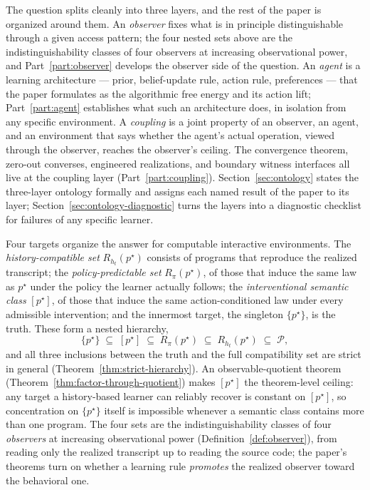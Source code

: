 \documentclass[11pt]{article}
\theoremstyle{definition}
\theoremstyle{remark}
\theoremstyle{plain}
\theoremstyle{definition}
\newcommand{\Pcal}{\mathcal{P}}
\begin{document}
The question splits cleanly into three layers, and the rest of the paper is organized around them. An \emph{observer} fixes what is in principle distinguishable through a given access pattern; the four nested sets above are the indistinguishability classes of four observers at increasing observational power, and Part~\ref{part:observer} develops the observer side of the question. An \emph{agent} is a learning architecture --- prior, belief-update rule, action rule, preferences --- that the paper formulates as the algorithmic free energy and its action lift; Part~\ref{part:agent} establishes what such an architecture does, in isolation from any specific environment. A \emph{coupling} is a joint property of an observer, an agent, and an environment that says whether the agent's actual operation, viewed through the observer, reaches the observer's ceiling. The convergence theorem, zero-out converses, engineered realizations, and boundary witness interfaces all live at the coupling layer (Part~\ref{part:coupling}). Section~\ref{sec:ontology} states the three-layer ontology formally and assigns each named result of the paper to its layer; Section~\ref{sec:ontology-diagnostic} turns the layers into a diagnostic checklist for failures of any specific learner.

Four targets organize the answer for computable interactive environments. The \emph{history-compatible set} $R_{h_t}(p^\star)$ consists of programs that reproduce the realized transcript; the \emph{policy-predictable set} $R_\pi(p^\star)$, of those that induce the same law as $p^\star$ under the policy the learner actually follows; the \emph{interventional semantic class} $[p^\star]$, of those that induce the same action-conditioned law under every admissible intervention; and the innermost target, the singleton $\{p^\star\}$, is the truth. These form a nested hierarchy,
\[
\{p^\star\}
\;\subseteq\;
[p^\star]
\;\subseteq\;
R_\pi(p^\star)
\;\subseteq\;
R_{h_t}(p^\star)
\;\subseteq\;
\Pcal,
\]
and all three inclusions between the truth and the full compatibility set are strict in general (Theorem~\ref{thm:strict-hierarchy}). An observable-quotient theorem (Theorem~\ref{thm:factor-through-quotient}) makes $[p^\star]$ the theorem-level ceiling: any target a history-based learner can reliably recover is constant on $[p^\star]$, so concentration on $\{p^\star\}$ itself is impossible whenever a semantic class contains more than one program. The four sets are the indistinguishability classes of four \emph{observers} at increasing observational power (Definition~\ref{def:observer}), from reading only the realized transcript up to reading the source code; the paper's theorems turn on whether a learning rule \emph{promotes} the realized observer toward the behavioral one.
\end{document}
